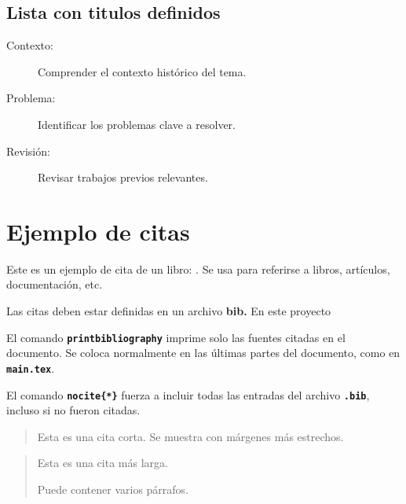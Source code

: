   
  \subsection{Lista con titulos definidos}
   \begin{description}
      \item[Contexto:] Comprender el contexto histórico del tema.
      \item[Problema:] Identificar los problemas clave a resolver.
      \item[Revisión:] Revisar trabajos previos relevantes.
    \end{description}
    
    \clearpage
 \section{Ejemplo de citas}
 

 Este es un ejemplo de cita de un libro: \cite{EjemploLibro}.  
 Se usa para referirse a libros, artículos, documentación, etc.
 
 Las citas deben estar definidas en un archivo \textbf{bib.}  
 En este proyecto
 
 El comando \texttt{\textbf{printbibliography}} imprime solo las fuentes citadas en el documento.  
Se coloca normalmente en las últimas partes del documento, como en \texttt{\textbf{main.tex}}.

El comando \texttt{\textbf{nocite\{*\}}} fuerza a incluir todas las entradas del archivo \texttt{\textbf{.bib}}, incluso si no fueron citadas.
 \begin{quote}
 Esta es una cita corta. Se muestra con márgenes más estrechos.
 \end{quote}
 
 \begin{quotation}
 Esta es una cita más larga.
 
 Puede contener varios párrafos.
 \end{quotation}
 \clearpage
 
